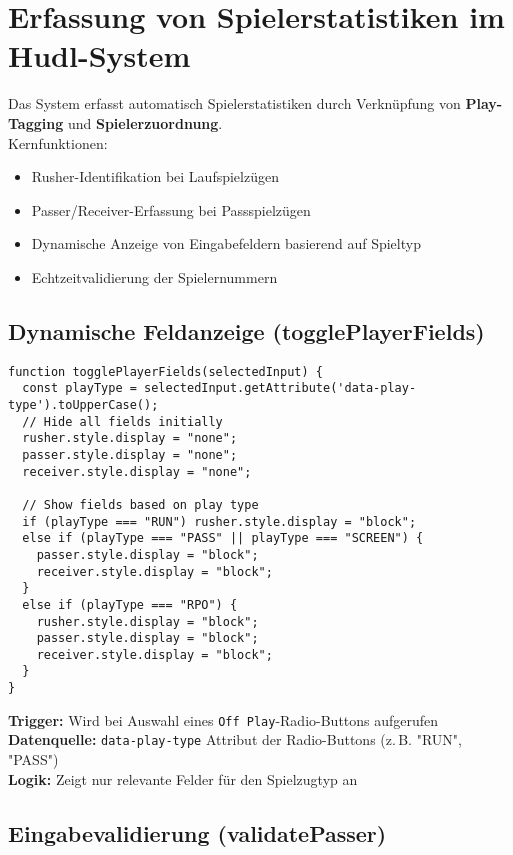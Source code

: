 \section{Erfassung von Spielerstatistiken im Hudl-System}

Das System erfasst automatisch Spielerstatistiken durch Verknüpfung von \textbf{Play-Tagging} und \textbf{Spielerzuordnung}.\\
Kernfunktionen:
\begin{itemize}
    \item Rusher-Identifikation bei Laufspielzügen
    \item Passer/Receiver-Erfassung bei Passspielzügen
    \item Dynamische Anzeige von Eingabefeldern basierend auf Spieltyp
    \item Echtzeitvalidierung der Spielernummern
\end{itemize}

\subsection{Dynamische Feldanzeige (togglePlayerFields)}

\begin{verbatim}
function togglePlayerFields(selectedInput) {
  const playType = selectedInput.getAttribute('data-play-type').toUpperCase();
  // Hide all fields initially
  rusher.style.display = "none";
  passer.style.display = "none";
  receiver.style.display = "none";

  // Show fields based on play type
  if (playType === "RUN") rusher.style.display = "block";
  else if (playType === "PASS" || playType === "SCREEN") {
    passer.style.display = "block";
    receiver.style.display = "block";
  }
  else if (playType === "RPO") {
    rusher.style.display = "block";
    passer.style.display = "block";
    receiver.style.display = "block";
  }
}
\end{verbatim}


\textbf{Trigger:} Wird bei Auswahl eines \texttt{Off Play}-Radio-Buttons aufgerufen \\
\textbf{Datenquelle:} \texttt{data-play-type} Attribut der Radio-Buttons (z.\,B. "RUN", "PASS") \\
\textbf{Logik:} Zeigt nur relevante Felder für den Spielzugtyp an

\subsection{Eingabevalidierung (validatePasser)}

